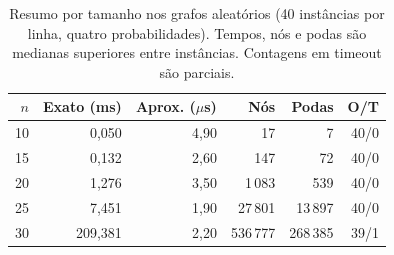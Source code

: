 \begin{table}[htbp]
\centering
\caption{Resumo por tamanho nos grafos aleatórios (40 instâncias por linha, quatro probabilidades). Tempos, nós e podas são medianas superiores entre instâncias. Contagens em timeout são parciais.}
\label{tab:sizes}
\small
\begin{tabular}{rrrrrr}
\toprule
$n$ & Exato (ms) & Aprox. ($\mu$s) & Nós & Podas & O/T \\
\midrule
10 & 0,050 & 4,90 & 17 & 7 & 40/0 \\
15 & 0,132 & 2,60 & 147 & 72 & 40/0 \\
20 & 1,276 & 3,50 & 1\,083 & 539 & 40/0 \\
25 & 7,451 & 1,90 & 27\,801 & 13\,897 & 40/0 \\
30 & 209,381 & 2,20 & 536\,777 & 268\,385 & 39/1 \\
\bottomrule
\end{tabular}
\end{table}
